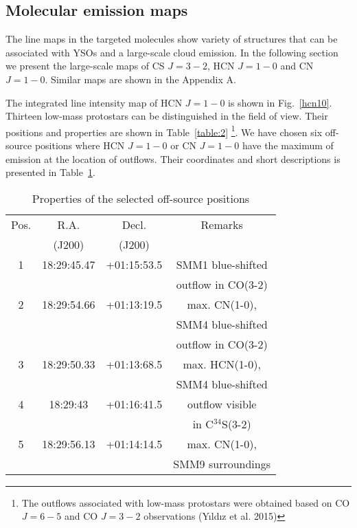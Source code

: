 \documentclass{aa}
\begin{document}
\subsection{Molecular emission maps}

The line maps in the targeted molecules show variety of structures that can be associated with YSOs and a large-scale cloud emission. In the following section we present the large-scale maps of CS $J=3-2$, HCN $J=1-0$ and CN $J=1-0$. Similar maps are shown in the Appendix A.

The integrated line intensity map of HCN $J=1-0$ is shown in Fig.~\ref{hcn10}. 
Thirteen low-mass protostars can be distinguished in the field of view. Their positions and properties are shown in Table~\ref{table:2} \footnote{The outflows associated with low-mass protostars were obtained based on CO $J=6-5$ and CO $J=3-2$ observations (Y{\i}ld{\i}z et al. 2015)}. We have chosen six off-source positions where HCN $J=1-0$ or CN $J=1-0$ have the maximum of emission at the location of outflows. Their coordinates and short descriptions is presented in Table~\ref{table:3}.



\begin{table}
\caption{Properties of the selected off-source positions}             %
\label{table:3}      %
\centering                          %
\begin{tabular}{c c c c} 
\hline\hline 
Pos. & R.A. & Decl. & Remarks\\
 & (J200) & (J200) & \\
\hline
1 & 18:29:45.47 & +01:15:53.5 & SMM1 blue-shifted \\
 & & & outflow in CO(3-2)\\
\hline
2 & 18:29:54.66 & +01:13:19.5 & max. CN(1-0), \\
 & & & SMM4 blue-shifted \\
 & & & outflow in CO(3-2)\\
\hline
3 & 18:29:50.33 & +01:13:68.5 & max. HCN(1-0), \\
 & & & SMM4 blue-shifted \\
\hline
4 & 18:29:43 & +01:16:41.5 & outflow visible \\
 & & &  in C$^{34}$S(3-2)\\
\hline
5 & 18:29:56.13 & +01:14:14.5 & max. CN(1-0), \\
 & & & SMM9 surroundings\\
\hline
\end{tabular}
\end{table}
\end{document}
